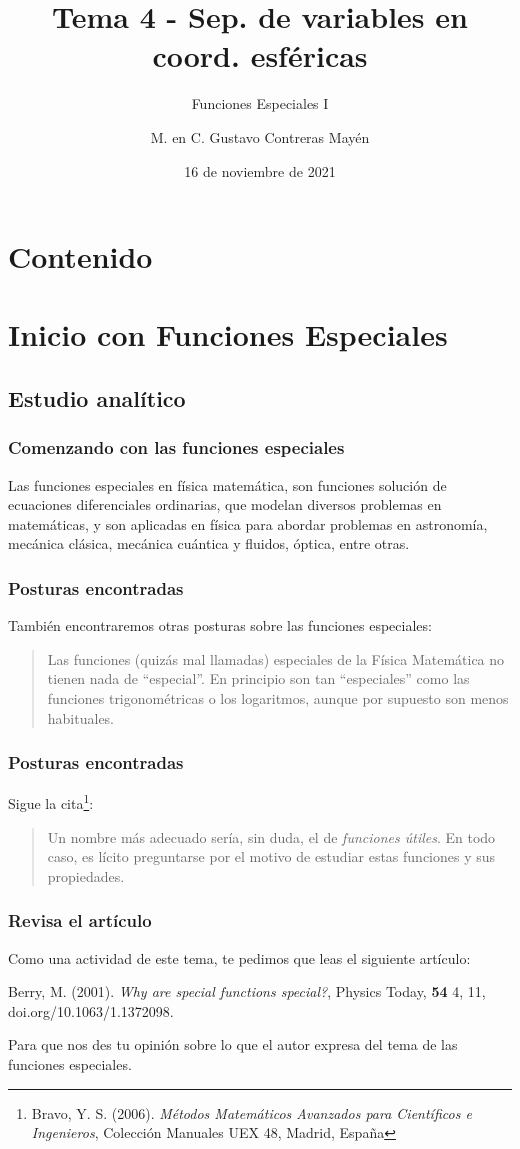 \documentclass[12pt]{beamer}
\date{16 de noviembre de 2021}
\title{\large{Tema 4 - Sep. de variables en coord. esféricas}}
\subtitle{Funciones Especiales I}
\author{M. en C. Gustavo Contreras Mayén}
\begin{document}
\maketitle
\fontsize{14}{14}\selectfont
{}

\section*{Contenido}

\section{Inicio con Funciones Especiales}
\subsection{Estudio analítico}

\begin{frame}
\frametitle{Comenzando con las funciones especiales}
Las funciones especiales en física matemática, son funciones solución de ecuaciones diferenciales ordinarias, que modelan diversos problemas en matemáticas, y son aplicadas en física para abordar problemas en astronomía, mecánica clásica, mecánica cuántica y fluidos, óptica, entre otras.
\end{frame}
\begin{frame}
\frametitle{Posturas encontradas}
También encontraremos otras posturas sobre las funciones especiales: 
\begin{quote}
Las funciones (quizás mal llamadas) especiales de la Física Matemática no tienen nada de \enquote{especial}. En principio son tan \enquote{especiales} como las funciones trigonométricas o los logaritmos, aunque por supuesto son menos habituales.
\end{quote}
\end{frame}
\begin{frame}
\frametitle{Posturas encontradas}
Sigue la cita\footnote{Bravo, Y. S. (2006). \textit{Métodos Matemáticos Avanzados para Científicos e Ingenieros}, Colección Manuales UEX 48, Madrid, España}:
\begin{quote}
Un nombre más adecuado sería, sin duda, el de \emph{funciones útiles}. En todo caso, es lícito preguntarse por el motivo de estudiar estas funciones y sus propiedades.
\end{quote}
\end{frame}
\begin{frame}
\frametitle{Revisa el artículo}
Como una actividad de este tema, te pedimos que leas el siguiente artículo: 
\begin{thebibliography}{X}
 Berry, M. (2001). \textit{Why are special functions special?}, Physics Today, \textbf{54} 4, 11, doi.org/10.1063/1.1372098.
\end{thebibliography}
Para que nos des tu opinión sobre lo que el autor expresa del tema de las funciones especiales.
\end{frame}
\end{document}
